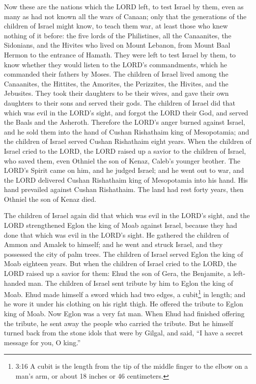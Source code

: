\mychapter{} \myverse*{}Now these are the nations which the LORD left, to test Israel by
them, even as many as had not known all the wars of Canaan;
\myverse{}only that the generations of the children of Israel might know, to teach them
war, at least those who knew nothing of it before:
\myverse{}the five lords of the Philistines, all the Canaanites, the Sidonians, and the
Hivites who lived on Mount Lebanon, from Mount Baal Hermon to the entrance of Hamath.
\myverse{}They were left to test Israel by them, to know whether they would listen to
the LORD’s commandments, which he commanded their fathers by Moses.
\myverse{}The children of Israel lived among the Canaanites, the Hittites, the Amorites,
the Perizzites, the Hivites, and the Jebusites.
\myverse{}They took their daughters to be their wives, and gave their own daughters to
their sons and served their gods.
\myverse{}The children of Israel did that which was evil in the LORD’s sight, and forgot
the LORD their God, and served the Baals and the Asheroth.
\myverse{}Therefore the LORD’s anger burned against Israel, and he sold them into the
hand of Cushan Rishathaim king of Mesopotamia; and the children of Israel served Cushan Rishathaim eight
years.
\myverse{}When the children of Israel cried to the LORD, the LORD raised up a savior to
the children of Israel, who saved them, even Othniel the son of Kenaz, Caleb’s younger brother.
\myverse{}The LORD’s Spirit came on him, and he judged Israel; and he went out to war,
and the LORD delivered Cushan Rishathaim king of Mesopotamia into his hand. His hand prevailed against
Cushan Rishathaim.
\myverse{}The land had rest forty years, then Othniel the son of Kenaz died.

\myverse{}The children of Israel again did that which was evil in the LORD’s
sight, and the LORD strengthened Eglon the king of Moab against Israel, because they had done that which
was evil in the LORD’s sight.
\myverse{}He gathered the children of Ammon and Amalek to himself; and he went and struck
Israel, and they possessed the city of palm trees.
\myverse{}The children of Israel served Eglon the king of Moab eighteen years.
\myverse{}But when the children of Israel cried to the LORD, the LORD raised up a savior
for them: Ehud the son of Gera, the Benjamite, a left-handed man. The children of Israel sent tribute
by him to Eglon the king of Moab.
\myverse{}Ehud made himself a sword which had two edges, a cubit\footnote{3:16 A cubit is the length from the tip of the middle finger to the elbow on a man’s arm, or about
	18 inches or 46 centimeters.} in length; and he wore it under his clothing on his right thigh.
\myverse{}He offered the tribute to Eglon king of Moab. Now Eglon was a very fat man.
\myverse{}When Ehud had finished offering the tribute, he sent away the people who carried
the tribute.
\myverse{}But he himself turned back from the stone idols that were by Gilgal, and said,
“I have a secret message for you, O king.”

